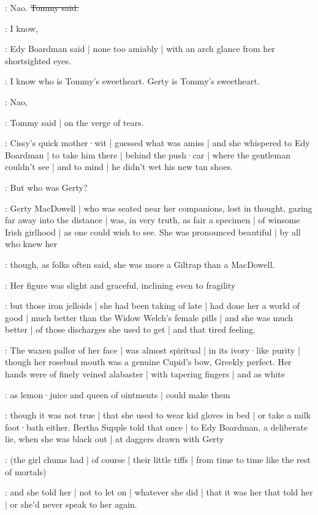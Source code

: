 \tommy:
Nao.
\sout{Tommy said.}

\edy:
I know,

:
Edy Boardman said |
none too amiably |
with an arch glance from her shortsighted eyes.

\edy:
I know who is Tommy's sweetheart.
Gerty is Tommy's sweetheart.

\tommy:
Nao,

:
Tommy said |
on the verge of tears.

:
Cissy's quick mother·wit |
guessed what was amiss |
and she whispered to Edy Boardman |
to take him there |
behind the push·car |
where the gentleman couldn't see |
and to mind |
he didn't wet his new tan shoes.

\Nnovel:
But who was Gerty?

\gertyNovel:
Gerty MacDowell |
who was seated near her companions,
lost in thought,
gazing far away into the distance |
was,%
in very truth,
as fair a specimen |
of winsome Irish girlhood |
as one could wish to see.
She was pronounced beautiful |
by all who knew her

\gertyReal:
though,
as folks often said,
she was more a Giltrap than a MacDowell.

\gertyNovel:
Her figure was slight and graceful,
inclining even to fragility

\gertyReal:
but those iron jelloids |
she had been taking of late |
had done her a world of good |
much better than the Widow Welch's female pills |
and she was much better |
of those discharges she used to get |
and that tired feeling.

\gertyNovel:
The waxen pallor of her face |
was almost spiritual |
in its ivory·like purity |
though her rosebud mouth was a genuine Cupid's bow,
Greekly perfect.
Her hands were of finely veined alabaster |
with tapering fingers |
and
as white

\gertyReal:
as lemon·juice
and queen of ointments |
could make them

\gertyJudgy:
though it was not true |
that she used to wear kid gloves in bed |
or take a milk foot·bath either.
Bertha Supple told that once |
to Edy Boardman,
a deliberate lie,
when she was black out |
at daggers drawn with Gerty

:
(the girl chums had |
of course |
their little tiffs |
from time to time
like the rest of mortals)

\gertyJudgy:
and she told her |
not to let on |
whatever she did |
that it was her that told her |
or she'd never speak to her again.

